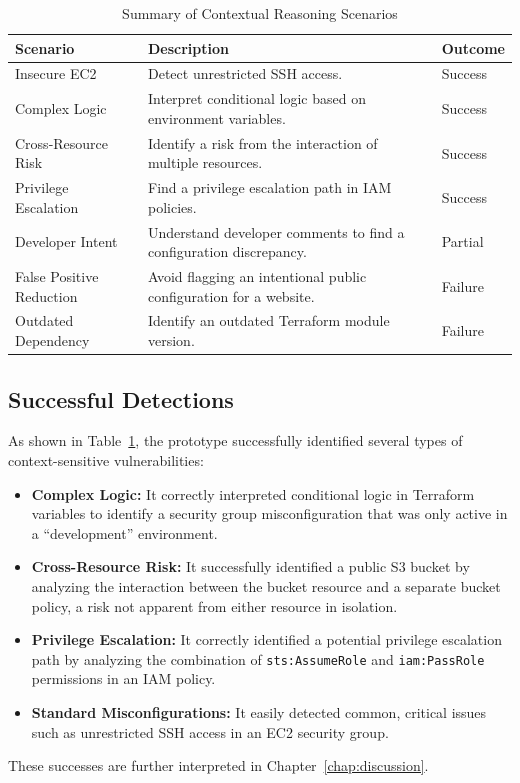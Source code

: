 \begin{table}[htbp]
	\centering
	\caption{Summary of Contextual Reasoning Scenarios}\label{tab:context-reasoning-summary}
	\begin{tabular}{p{}p{}l}
		\hline
		\textbf{Scenario} & \textbf{Description} & \textbf{Outcome} \\
		\hline
		Insecure EC2 & Detect unrestricted SSH access. & Success \\
		Complex Logic & Interpret conditional logic based on environment variables. & Success \\
		Cross-Resource Risk & Identify a risk from the interaction of multiple resources. & Success \\
		Privilege Escalation & Find a privilege escalation path in IAM policies. & Success \\
		Developer Intent & Understand developer comments to find a configuration discrepancy. & Partial \\
		False Positive Reduction & Avoid flagging an intentional public configuration for a website. & Failure \\
		Outdated Dependency & Identify an outdated Terraform module version. & Failure \\
		\hline
	\end{tabular}
\end{table}

\subsection{Successful Detections}
As shown in Table~\ref{tab:context-reasoning-summary}, the prototype successfully identified several types of context-sensitive vulnerabilities:
\begin{itemize}
    \item \textbf{Complex Logic:} It correctly interpreted conditional logic in Terraform variables to identify a security group misconfiguration that was only active in a ``development'' environment.
    \item \textbf{Cross-Resource Risk:} It successfully identified a public S3 bucket by analyzing the interaction between the bucket resource and a separate bucket policy, a risk not apparent from either resource in isolation.
    \item \textbf{Privilege Escalation:} It correctly identified a potential privilege escalation path by analyzing the combination of \texttt{sts:AssumeRole} and \texttt{iam:PassRole} permissions in an IAM policy.
    \item \textbf{Standard Misconfigurations:} It easily detected common, critical issues such as unrestricted SSH access in an EC2 security group.
\end{itemize}
These successes are further interpreted in Chapter~\ref{chap:discussion}.

